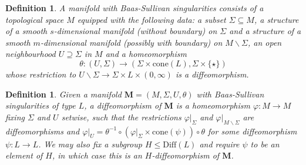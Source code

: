 \documentclass[reqno,a4paper]{article}
\numberwithin{equation}{section}
\theoremstyle{italicised}
\theoremstyle{upright}
\newtheorem{defn}[thm]{Definition}
\theoremstyle{italicised-restate}
\renewcommand{\leq}{\leqslant}
\begin{document}
\begin{defn}
A \emph{manifold with Baas-Sullivan singularities} \cite{Sullivan1967Hauptvermutungmanifolds,Baas1973bordismtheorymanifolds} consists of a topological space $M$ equipped with the following data: a subset $\Sigma \subseteq M$, a structure of a smooth $s$-dimensional manifold (without boundary) on $\Sigma$ and a structure of a smooth $m$-dimensional manifold (possibly with boundary) on $M \smallsetminus \Sigma$, an open neighbourhood $U \supseteq \Sigma$ in $M$ and a homeomorphism
\[
\theta \colon (U,\Sigma) \longrightarrow (\Sigma \times \mathrm{cone}(L) , \Sigma \times \{\star\})
\]
whose restriction to $U \smallsetminus \Sigma \longrightarrow \Sigma \times L \times (0,\infty)$ is a diffeomorphism.
\end{defn}

\begin{defn}\label{d:diff-manifold-with-sing}
Given a manifold $\mathbf{M} = (M,\Sigma,U,\theta)$ with Baas-Sullivan singularities of type $L$, a \emph{diffeomorphism} of $\mathbf{M}$ is a homeomorphism $\varphi \colon M \to M$ fixing $\Sigma$ and $U$ setwise, such that the restrictions $\varphi|_\Sigma$ and $\varphi|_{M \smallsetminus \Sigma}$ are diffeomorphisms and $\varphi|_U = \theta^{-1} \circ (\varphi|_\Sigma \times \mathrm{cone}(\psi)) \circ \theta$ for some diffeomorphism $\psi \colon L \to L$. We may also fix a subgroup $H \leq \mathrm{Diff}(L)$ and require $\psi$ to be an element of $H$, in which case this is an \emph{$H$-diffeomorphism} of $\mathbf{M}$.
\end{defn}
\end{document}
